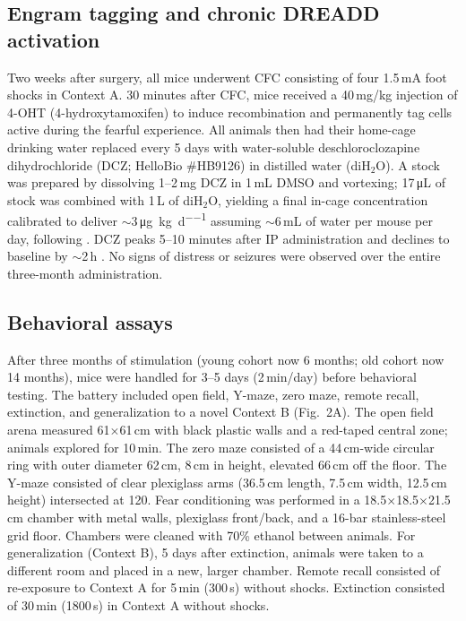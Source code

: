 \documentclass[11pt]{article}
\begin{document}
\subsection{Engram tagging and chronic DREADD activation}
Two weeks after surgery, all mice underwent CFC consisting of four 1.5\,mA foot shocks in Context A. 30 minutes after CFC, mice received a 40\,mg/kg injection of 4-OHT (4-hydroxytamoxifen) to induce recombination and permanently tag cells active during the fearful experience. All animals then had their home-cage drinking water replaced every 5 days with water-soluble deschloroclozapine dihydrochloride (DCZ; HelloBio \#HB9126) in distilled water (diH$_2$O). A stock was prepared by dissolving 1--2\,mg DCZ in 1\,mL DMSO and vortexing; 17\,\si{\micro\liter} of stock was combined with 1\,L of diH$_2$O, yielding a final in-cage concentration calibrated to deliver $\sim$3\,\si{\micro\gram\per\kilogram\per\day} assuming $\sim$6\,mL of water per mouse per day, following \citet{suthard2023}. DCZ peaks 5--10 minutes after IP administration and declines to baseline by $\sim$2\,h \citep{nagai2020}. No signs of distress or seizures were observed over the entire three-month administration.

\subsection{Behavioral assays}
After three months of stimulation (young cohort now 6 months; old cohort now 14 months), mice were handled for 3--5 days (2\,min/day) before behavioral testing. The battery included open field, Y-maze, zero maze, remote recall, extinction, and generalization to a novel Context B (Fig.~2A). The open field arena measured 61$\times$61\,cm with black plastic walls and a red-taped central zone; animals explored for 10\,min. The zero maze consisted of a 44\,cm-wide circular ring with outer diameter 62\,cm, 8\,cm in height, elevated 66\,cm off the floor. The Y-maze consisted of clear plexiglass arms (36.5\,cm length, 7.5\,cm width, 12.5\,cm height) intersected at 120\textdegree. Fear conditioning was performed in a 18.5$\times$18.5$\times$21.5\,cm chamber with metal walls, plexiglass front/back, and a 16-bar stainless-steel grid floor. Chambers were cleaned with 70\% ethanol between animals. For generalization (Context B), 5 days after extinction, animals were taken to a different room and placed in a new, larger chamber. Remote recall consisted of re-exposure to Context A for 5\,min (300\,s) without shocks. Extinction consisted of 30\,min (1800\,s) in Context A without shocks.
\end{document}
